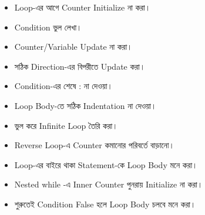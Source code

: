 \begin{rememberbox}

\begin{itemize}

\item Loop-এর আগে Counter Initialize না করা।

\item Condition ভুল লেখা।

\item Counter/Variable Update না করা।

\item সঠিক Direction-এর বিপরীতে Update করা।

\item Condition-এর শেষে
\textenglish{\ttfamily :}
না দেওয়া।

\item Loop Body-তে সঠিক Indentation না দেওয়া।

\item ভুল করে Infinite Loop তৈরি করা।

\item Reverse Loop-এ Counter কমানোর পরিবর্তে বাড়ানো।

\item Loop-এর বাইরে থাকা Statement-কে Loop Body মনে করা।

\item Nested
\textenglish{\ttfamily while}
-এ Inner Counter পুনরায় Initialize না করা।

\item শুরুতেই Condition False হলে Loop Body চলবে মনে করা।

\end{itemize}

\end{rememberbox}


